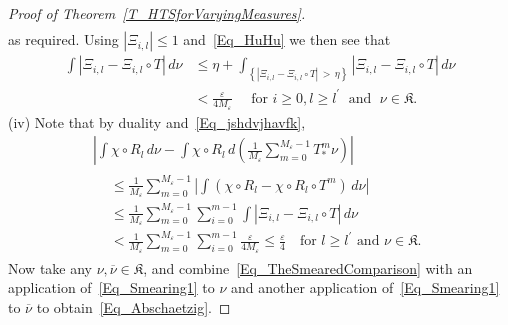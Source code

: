 \documentclass[10pt]{amsart}
\theoremstyle{definition}\newtheorem{defi}[theo]{Definition}\newtheorem{rema}[theo]{Remark}\newtheorem{exam}[theo]{Example}\newtheorem{exem}[theo]{Example}\newtheorem{nota}[theo]{Notation}
\newcommand{\frkK}{\mathfrak{K}}
\begin{document}
\begin{proof}[{Proof of Theorem~\ref{T_HTSforVaryingMeasures}}]
\begin{multline*}
\end{multline*}
as required. Using $\left\vert \Xi_{i,l}\right\vert \leq1$ and~\eqref{Eq_HuHu} we then see that
\begin{equation}\label{Eq_jshdvjhavfk}
\begin{split}
\int\left\vert \Xi_{i,l}-\Xi_{i,l}\circ T\right\vert \,d\nu  &\leq\eta +\int_{\left\{\left\vert \Xi_{i,l}-\Xi_{i,l}\circ T\right\vert\,>\,\eta\right\}}\left\vert
\Xi_{i,l}-\Xi_{i,l}\circ T\right\vert \,d\nu\\
&<\frac{\varepsilon}{4M_{\varepsilon}}\quad\text{  for }i\geq0, l\geq l^{\prime}\;\text{ and }\;\nu\in\frkK.
\end{split}
\end{equation}
(iv) \label{prf.theo6.3.4} Note that by duality and~\eqref{Eq_jshdvjhavfk},
\begin{multline}\label{Eq_Smearing1}
 \left\vert \int\chi\circ R_{l}\,d\nu-\int\chi\circ R_{l}\,d\left(\frac {1}{M_{\varepsilon}}\sum_{m=0}^{M_{\varepsilon}-1}T_{\ast}^{m}\nu\right)
\right\vert\\
\begin{aligned}
& \leq\frac{1}{M_{\varepsilon}}\sum_{m=0}^{M_{\varepsilon}-1}\left\vert
\int(\chi\circ R_{l}-\chi\circ R_{l}\circ T^{m})\,d\nu\right\vert \\
& \leq\frac{1}{M_{\varepsilon}}\sum_{m=0}^{M_{\varepsilon}-1}\sum_{i=0} ^{m-1}\int\left\vert \Xi_{i,l}-\Xi_{i,l}\circ T\right\vert \,d\nu\\
& <\frac{1}{M_{\varepsilon}}\sum_{m=0}^{M_{\varepsilon}-1}\sum_{i=0} ^{m-1}\frac{\varepsilon}{4M_{\varepsilon}}\leq\frac{\varepsilon}{4}\quad \text{
for }l\geq l^{\prime}\text{ and }\nu\in\frkK.
\end{aligned}
\end{multline}
Now take any $\nu,\overline{\nu}\in\frkK$, and combine~\eqref{Eq_TheSmearedComparison} with an application of~\eqref{Eq_Smearing1} to $\nu$ and another application of~\eqref{Eq_Smearing1} to $\overline{\nu}$ to obtain~\eqref{Eq_Abschaetzig}.\qedhere
\end{proof}
\end{document}
